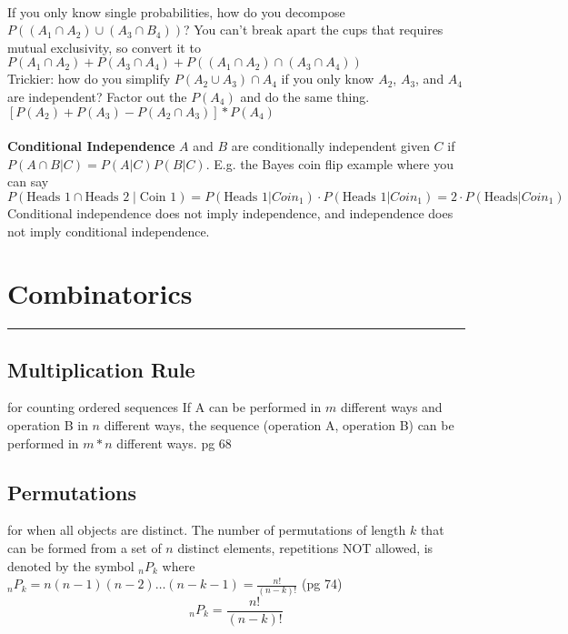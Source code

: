 \hfill \\

If you only know single probabilities, how do you decompose $P((A_1 \cap A_2) \cup (A_3 \cap B_4))$?  You can't break apart the cups {\tiny that requires mutual exclusivity}, so convert it to $P(A_1 \cap A_2) + P(A_3 \cap A_4) + P((A_1 \cap A_2) \cap (A_3 \cap A_4))$ \hfill \\

Trickier: how do you simplify $P(A_2 \cup A_3) \cap A_4 $ if you only know $A_2$, $A_3$, and $A_4$ are independent?  Factor out the $P(A_4)$ and do the same thing. $[P(A_2) + P(A_3) - P(A_2 \cap A_3)]*P(A_4)$\hfill \\
\hfill \\

\textbf{Conditional Independence}  ${A}$ and ${B}$ are conditionally independent given ${C}$ if $P({A}\cap {B}|{C}) = P({A}|{C})P({B}|{C})$.  E.g. the Bayes coin flip example where you can say $P(\mbox{Heads 1} \cap \mbox{Heads 2} \mid \mbox{Coin 1}) = P(\mbox{Heads 1}|Coin_1) \cdot P(\mbox{Heads 1}|Coin_1) = 2 \cdot P(\mbox{Heads}|Coin_1)$ Conditional independence does not imply independence, and independence does not imply conditional independence.


\section{Combinatorics}
\smallskip \hrule height 2pt \smallskip

\subsection{Multiplication Rule} for counting ordered sequences
If A can be performed in $m$ different ways and operation B in $n$ different ways, the sequence (operation A, operation B) can be performed in $m*n$ different ways. {\tiny pg 68}

\subsection{Permutations} for when all objects are distinct.
The number of permutations of length $k$ that can be formed from a set of $n$ distinct elements, repetitions NOT allowed, is denoted by the symbol ${_n}P_k$ where ${_n}P_k = n(n-1)(n-2) \dots (n - k - 1) = \frac{n!}{(n-k)!}$  {\tiny (pg 74) }\hfill \\
\[  {_n}P_k = \frac{n!}{(n-k)!} \]

